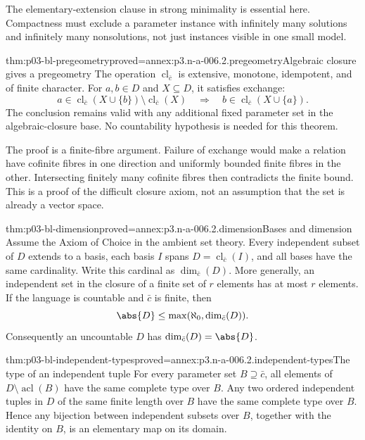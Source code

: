 The elementary-extension clause in strong minimality is essential here.
Compactness must exclude a parameter instance with infinitely many
solutions and infinitely many nonsolutions, not just instances visible in
one small model.

\begin{hbtheorem}{thm:p03-bl-pregeometry}{proved=annex:p3.n-a-006.2.pregeometry}{Algebraic closure gives a pregeometry}
The operation \(\operatorname{cl}_{\bar c}\) is extensive, monotone,
idempotent, and of finite character. For \(a,b\in D\) and \(X\subseteq D\),
it satisfies exchange:
\[
 a\in\operatorname{cl}_{\bar c}(X\cup\{b\})
       \setminus\operatorname{cl}_{\bar c}(X)
 \quad\Longrightarrow\quad
 b\in\operatorname{cl}_{\bar c}(X\cup\{a\}).
\]
The conclusion remains valid with any additional fixed parameter set in
the algebraic-closure base. No countability hypothesis is needed for this
theorem.
\end{hbtheorem}

The proof is a finite-fibre argument. Failure of exchange would make a
relation have cofinite fibres in one direction and uniformly bounded finite
fibres in the other. Intersecting finitely many cofinite fibres then
contradicts the finite bound. This is a proof of the difficult closure
axiom, not an assumption that the set is already a vector space.

\begin{hbtheorem}{thm:p03-bl-dimension}{proved=annex:p3.n-a-006.2.dimension}{Bases and dimension}
Assume the Axiom of Choice in the ambient set theory. Every independent
subset of \(D\) extends to a basis, each basis \(I\) spans
\(D=\operatorname{cl}_{\bar c}(I)\), and all bases have the same cardinality.
Write this cardinal as \(\dim_{\bar c}(D)\). More generally, an independent
set in the closure of a finite set of \(r\) elements has at most \(r\)
elements. If the language is countable and \(\bar c\) is finite, then
\[
 \abs{D}\leq\max(\aleph_0,\dim_{\bar c}(D)).
\]
Consequently an uncountable \(D\) has
\(\dim_{\bar c}(D)=\abs{D}\).
\end{hbtheorem}

\begin{hblemma}{thm:p03-bl-independent-types}{proved=annex:p3.n-a-006.2.independent-types}{The type of an independent tuple}
For every parameter set \(B\supseteq\bar c\), all elements of
\(D\setminus\operatorname{acl}(B)\) have the same complete type over \(B\).
Any two ordered independent tuples in \(D\) of the same finite length over
\(B\) have the same complete type over \(B\). Hence any bijection between
independent subsets over \(B\), together with the identity on \(B\), is an
elementary map on its domain.
\end{hblemma}

